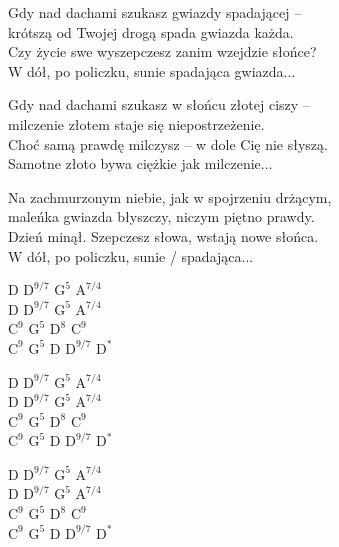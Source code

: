 \begin{text}
    Gdy nad dachami szukasz gwiazdy spadającej –\\
    krótszą od Twojej drogą spada gwiazda każda.\\
    Czy życie swe wyszepczesz zanim wzejdzie słońce?\\
    W dół, po policzku, sunie spadająca gwiazda...

    Gdy nad dachami szukasz w słońcu złotej ciszy –\\
    milczenie złotem staje się niepostrzeżenie.\\
    Choć samą prawdę milczysz – w dole Cię nie słyszą.\\
    Samotne złoto bywa ciężkie jak milczenie...

    Na zachmurzonym niebie, jak w spojrzeniu drżącym,\\
    maleńka gwiazda błyszczy, niczym piętno prawdy.\\
    Dzień minął. Szepczesz słowa, wstają nowe słońca.\\
    W dół, po policzku, sunie / spadająca...
\end{text}
\begin{chord}
    D $\mathrm{D^{9/7}}$ $\mathrm{G^{5}}$ $\mathrm{A^{7/4}}$\\
    D $\mathrm{D^{9/7}}$ $\mathrm{G^5}$ $\mathrm{A^{7/4}}$\\
    $\mathrm{C^9}$ $\mathrm{G^5}$ $\mathrm{D^8}$ $\mathrm{C^9}$\\
    $\mathrm{C^9}$ $\mathrm{G^5}$ D $\mathrm{D^{9/7}}$ $\mathrm{D^*}$

    D $\mathrm{D^{9/7}}$ $\mathrm{G^{5}}$ $\mathrm{A^{7/4}}$\\
    D $\mathrm{D^{9/7}}$ $\mathrm{G^5}$ $\mathrm{A^{7/4}}$\\
    $\mathrm{C^9}$ $\mathrm{G^5}$ $\mathrm{D^8}$ $\mathrm{C^9}$\\
    $\mathrm{C^9}$ $\mathrm{G^5}$ D $\mathrm{D^{9/7}}$ $\mathrm{D^*}$

    D $\mathrm{D^{9/7}}$ $\mathrm{G^{5}}$ $\mathrm{A^{7/4}}$\\
    D $\mathrm{D^{9/7}}$ $\mathrm{G^5}$ $\mathrm{A^{7/4}}$\\
    $\mathrm{C^9}$ $\mathrm{G^5}$ $\mathrm{D^8}$ $\mathrm{C^9}$\\
    $\mathrm{C^9}$ $\mathrm{G^5}$ D $\mathrm{D^{9/7}}$ $\mathrm{D^*}$
\end{chord}
